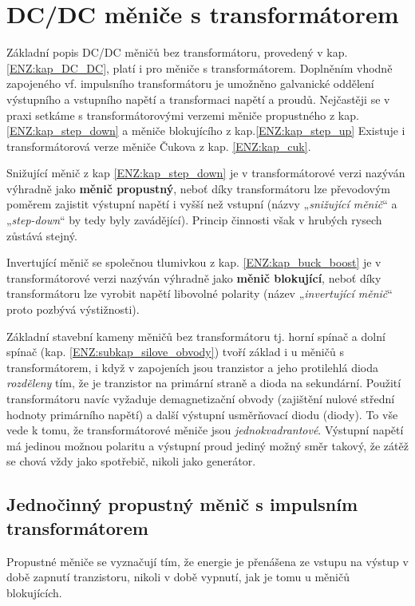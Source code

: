 \section{DC/DC měniče s transformátorem}
  Základní popis DC/DC měničů bez transformátoru, provedený v kap. \ref{ENZ:kap_DC_DC}, platí i pro 
  měniče s transformátorem. Doplněním vhodně zapojeného vf. impulsního transformátoru je umožněno 
  galvanické oddělení výstupního a vstupního napětí a transformaci napětí a proudů. Nejčastěji se v 
  praxi setkáme s transformátorovými verzemi měniče propustného z kap. \ref{ENZ:kap_step_down} a 
  měniče blokujícího z kap.\ref{ENZ:kap_step_up} Existuje i transformátorová verze měniče Čukova z 
  kap. \ref{ENZ:kap_cuk}.

  Snižující měnič z kap \ref{ENZ:kap_step_down} je v transformátorové verzi nazýván výhradně jako
  \textbf{měnič propustný}, neboť díky transformátoru lze převodovým poměrem zajistit výstupní 
  napětí i vyšší než vstupní (názvy „\emph{snižující měnič}“ a „\emph{step-down}“ by tedy byly 
  zavádějící). Princip činnosti však v hrubých rysech zůstává stejný.

  Invertující měnič se společnou tlumivkou z kap. \ref{ENZ:kap_buck_boost} je v transformátorové 
  verzi nazýván výhradně jako \textbf{měnič blokující}, neboť díky transformátoru lze vyrobit napětí 
  libovolné polarity (název „\emph{invertující měnič}“ proto pozbývá výstižnosti).

  Základní stavební kameny měničů bez transformátoru tj. horní spínač a dolní spínač (kap.
  \ref{ENZ:subkap_silove_obvody}) tvoří základ i u měničů s transformátorem, i když v zapojeních 
  jsou tranzistor a jeho protilehlá dioda \emph{rozděleny} tím, že je tranzistor na primární straně 
  a dioda na sekundární. Použití transformátoru navíc vyžaduje demagnetizační obvody (zajištění 
  nulové střední hodnoty primárního napětí) a další výstupní usměrňovací diodu (diody). To vše vede 
  k tomu, že transformátorové měniče jsou \emph{jednokvadrantové}. Výstupní napětí má jedinou možnou 
  polaritu a výstupní proud jediný možný směr takový, že zátěž se chová vždy jako spotřebič, nikoli 
  jako generátor.

  \subsection{Jednočinný propustný měnič s impulsním transformátorem} 
    Propustné měniče se vyznačují tím, že energie je přenášena ze vstupu na výstup v době zapnutí 
    tranzistoru, nikoli v době vypnutí, jak je tomu u měničů blokujících.
    
